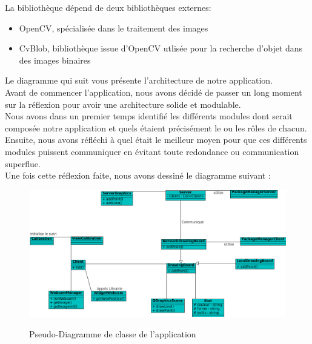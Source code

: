 \documentclass{report}
\begin{document}
				La bibliothèque dépend de deux bibliothèques externes:
				\begin{itemize}
					\item OpenCV, spécialisée dans le traitement des images
					\item CvBlob, bibliothèque issue d'OpenCV utlisée pour la recherche d'objet dans des images binaires
				\end{itemize}

				\newpage			
				Le diagramme qui suit vous présente l'architecture de notre application. \\
Avant de commencer l'application, nous avons décidé de passer un long moment sur la réflexion pour avoir une architecture solide et modulable.\\Nous avons dans un premier temps identifié les différents modules dont serait composée notre application et quels étaient précisément le ou les rôles de chacun. \\Ensuite, nous avons réfléchi à quel était le meilleur moyen pour que ces différents modules puissent communiquer en évitant toute redondance ou communication superflue. \\Une fois cette réflexion faite, nous avons dessiné le diagramme suivant : \\
				\begin{figure}[!h]
						\centering
						\includegraphics[scale=0.6]{../uml/classes.png}\\
						\caption{Pseudo-Diagramme de classe de l'application}
						\label{Pseudo-Diagramme de classe de l'application}
				\end{figure}
				
\end{document}
